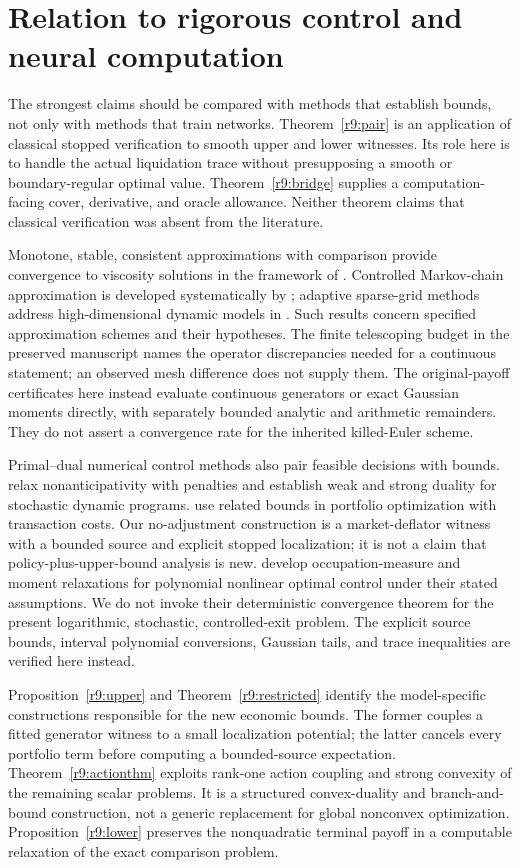 \section{Relation to rigorous control and neural computation}\label{r9:related}
The strongest claims should be compared with methods that establish bounds, not only with methods that train networks. Theorem~\ref{r9:pair} is an application of classical stopped verification to smooth upper and lower witnesses. Its role here is to handle the actual liquidation trace without presupposing a smooth or boundary-regular optimal value. Theorem~\ref{r9:bridge} supplies a computation-facing cover, derivative, and oracle allowance. Neither theorem claims that classical verification was absent from the literature.

Monotone, stable, consistent approximations with comparison provide convergence to viscosity solutions in the framework of \citet{barles1991}. Controlled Markov-chain approximation is developed systematically by \citet{kushner2001}; adaptive sparse-grid methods address high-dimensional dynamic models in \citet{brumm2017}. Such results concern specified approximation schemes and their hypotheses. The finite telescoping budget in the preserved manuscript names the operator discrepancies needed for a continuous statement; an observed mesh difference does not supply them. The original-payoff certificates here instead evaluate continuous generators or exact Gaussian moments directly, with separately bounded analytic and arithmetic remainders. They do not assert a convergence rate for the inherited killed-Euler scheme.

Primal--dual numerical control methods also pair feasible decisions with bounds. \citet{brown2010} relax nonanticipativity with penalties and establish weak and strong duality for stochastic dynamic programs. \citet{brown2011} use related bounds in portfolio optimization with transaction costs. Our no-adjustment construction is a market-deflator witness with a bounded source and explicit stopped localization; it is not a claim that policy-plus-upper-bound analysis is new. \citet{lasserre2008} develop occupation-measure and moment relaxations for polynomial nonlinear optimal control under their stated assumptions. We do not invoke their deterministic convergence theorem for the present logarithmic, stochastic, controlled-exit problem. The explicit source bounds, interval polynomial conversions, Gaussian tails, and trace inequalities are verified here instead.

Proposition~\ref{r9:upper} and Theorem~\ref{r9:restricted} identify the model-specific constructions responsible for the new economic bounds. The former couples a fitted generator witness to a small localization potential; the latter cancels every portfolio term before computing a bounded-source expectation. Theorem~\ref{r9:actionthm} exploits rank-one action coupling and strong convexity of the remaining scalar problems. It is a structured convex-duality and branch-and-bound construction, not a generic replacement for global nonconvex optimization. Proposition~\ref{r9:lower} preserves the nonquadratic terminal payoff in a computable relaxation of the exact comparison problem.

